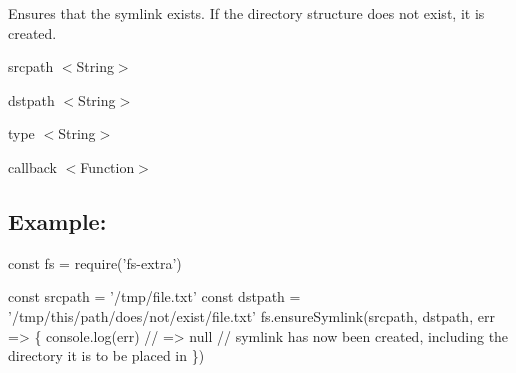 Ensures that the symlink exists. If the directory structure does not exist, it is created.


\begin{DoxyItemize}
\item {\ttfamily srcpath} {\ttfamily $<$String$>$}
\item {\ttfamily dstpath} {\ttfamily $<$String$>$}
\item {\ttfamily type} {\ttfamily $<$String$>$}
\item {\ttfamily callback} {\ttfamily $<$Function$>$}
\end{DoxyItemize}

\subsection*{Example\+:}


\begin{DoxyCode}
const fs = require('fs-extra')

const srcpath = '/tmp/file.txt'
const dstpath = '/tmp/this/path/does/not/exist/file.txt'
fs.ensureSymlink(srcpath, dstpath, err => \{
  console.log(err) // => null
  // symlink has now been created, including the directory it is to be placed in
\})
\end{DoxyCode}
 